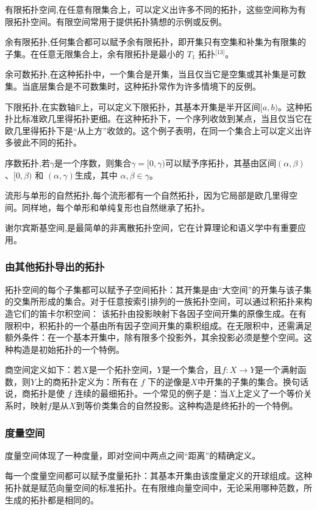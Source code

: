 有限拓扑空间,在任意有限集合上，可以定义出许多不同的拓扑，这些空间称为有限拓扑空间。有限空间常用于提供拓扑猜想的示例或反例。

余有限拓扑,任何集合都可以赋予余有限拓扑，即开集只有空集和补集为有限集的子集。在任意无限集合上，余有限拓扑是最小的 $T_1$ 拓扑\(^\text{[13]}\)。

余可数拓扑,在这种拓扑中，一个集合是开集，当且仅当它是空集或其补集是可数集。当底层集合是不可数集时，这种拓扑常作为许多情境下的反例。

下限拓扑,在实数轴$\mathbb{R}$上，可以定义下限拓扑，其基本开集是半开区间$[a, b)$。这种拓扑比标准欧几里得拓扑更细。在这种拓扑下，一个序列收敛到某点，当且仅当它在欧几里得拓扑下是“从上方”收敛的。这个例子表明，在同一个集合上可以定义出许多彼此不同的拓扑。

序数拓扑,若$\gamma$是一个序数，则集合$\gamma = [0, \gamma)$可以赋予序拓扑，其基由区间$(\alpha, \beta)$、$[0, \beta)$ 和 $(\alpha, \gamma)$生成，其中 $\alpha, \beta \in \gamma$。

流形与单形的自然拓扑,每个流形都有一个自然拓扑，因为它局部是欧几里得空间。同样地，每个单形和单纯复形也自然继承了拓扑。

谢尔宾斯基空间,是最简单的非离散拓扑空间，它在计算理论和语义学中有重要应用。
\subsubsection{由其他拓扑导出的拓扑}
拓扑空间的每个子集都可以赋予子空间拓扑：其开集是由“大空间”的开集与该子集的交集所形成的集合。对于任意按索引排列的一族拓扑空间，可以通过积拓扑来构造它们的笛卡尔积空间：
该拓扑由投影映射下各因子空间开集的原像生成。在有限积中，积拓扑的一个基由所有因子空间开集的乘积组成。在无限积中，还需满足额外条件：在一个基本开集中，除有限多个投影外，其余投影必须是整个空间。这种构造是初始拓扑的一个特例。

商空间定义如下：若$X$是一个拓扑空间，$Y$是一个集合，且$f: X \to Y$是一个满射函数，则$Y$上的商拓扑定义为：所有在 $f$ 下的逆像是$X$中开集的子集的集合。换句话说，商拓扑是使 $f$ 连续的最细拓扑。一个常见的例子是：当$X$上定义了一个等价关系时，映射$f$是从$X$到等价类集合的自然投影。这种构造是终拓扑的一个特例。
\subsubsection{度量空间}
度量空间体现了一种度量，即对空间中两点之间“距离”的精确定义。

每一个度量空间都可以赋予度量拓扑：其基本开集由该度量定义的开球组成。这种拓扑就是赋范向量空间的标准拓扑。在有限维向量空间中，无论采用哪种范数，所生成的拓扑都是相同的。

